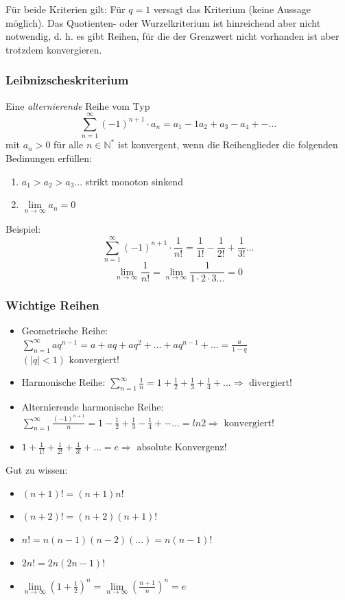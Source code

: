 Für beide Kriterien gilt: Für \(q = 1\) versagt das Kriterium (keine Aussage möglich). Das Quotienten- oder Wurzelkriterium ist hinreichend aber nicht notwendig, d. h. es gibt Reihen, für die der Grenzwert nicht vorhanden ist aber trotzdem konvergieren.

\subsubsection*{Leibnizscheskriterium}
\begin{definition}Eine \textit{alternierende} Reihe vom Typ
$$ \sum\limits_{n=1}^{\infty} (-1)^{n+1} \cdot a_n = a_1 -1 a_2 + a_3 - a_4 + - ...$$
mit $a_n > 0$ für alle $n \in \mathbb{N}^*$ ist konvergent, wenn die Reihenglieder die folgenden Bedinungen erfüllen:
\begin{enumerate}
	\item $a_1 > a_2 > a_3 ...$ strikt monoton sinkend
	\item $\lim\limits_{n \rightarrow \infty} a_n = 0$
\end{enumerate}
\end{definition}

Beispiel:
$$ \sum\limits_{n=1}^{\infty} (-1)^{n+1} \cdot \frac{1}{n!}  = \frac{1}{1!} - \frac{1}{2!} + \frac{1}{3!} ... $$ 
$$ \lim\limits_{n\rightarrow \infty} \frac{1}{n!} = \lim\limits_{n\rightarrow \infty} \frac{1}{1 \cdot 2 \cdot 3 ...} = 0$$

\subsubsection*{Wichtige Reihen}
\begin{itemize}
	\item Geometrische Reihe: \\$\sum\limits_{n=1}^{\infty} aq^{n-1} = a + aq + aq^2 + ... + aq^{n-1} + ... = \frac{a}{1-q}$  $(|q| <1) \text{ konvergiert! }$
	\item Harmonische Reihe: $\sum\limits_{n=1}^{\infty} \frac{1}{n} = 1 + \frac{1}{2} + \frac{1}{3} + \frac{1}{4} + ... \Rightarrow \text{ divergiert! }$
	\item Alternierende harmonische Reihe: $\sum\limits_{n=1}^{\infty} \frac{(-1)^{n+1}}{n} = 1 - \frac{1}{2} + \frac{1}{3} - \frac{1}{4} + - ... = ln{2} \Rightarrow \text{ konvergiert! } $
	\item $1 + \frac{1}{1!} + \frac{1}{2!}+\frac{1}{3!} + ... = e \Rightarrow \text{ absolute Konvergenz! }$
\end{itemize}
Gut zu wissen:
\begin{itemize}
	\item $(n+1)! = (n+1)n!$
	\item $(n+2)! = (n+2)(n+1)!$
	\item $n! = n(n-1)(n-2)(...) = n(n-1)!$
	\item $2n! = 2n(2n-1)!$
	\item $\lim\limits_{n \rightarrow \infty}(1+\frac{1}{2})^n = \lim\limits_{n \rightarrow \infty}\left(\frac{n+1}{n}\right)^n = e $
\end{itemize}

